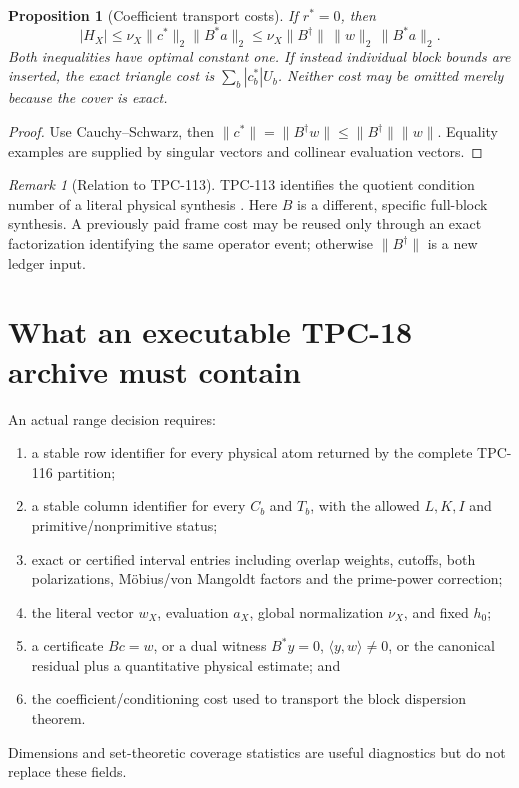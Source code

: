 \documentclass[11pt]{article}
\newtheorem{proposition}[theorem]{Proposition}
\theoremstyle{definition}
\theoremstyle{remark}
\newtheorem{remark}[theorem]{Remark}
\begin{document}
\begin{proposition}[Coefficient transport costs]
\label{prop:transport}
If \(r^*=0\), then
\[
 |H_X|
 \le\nu_X\|c^*\|_2\|B^*a\|_2
 \le\nu_X\|B^\dagger\|\,\|w\|_2\,\|B^*a\|_2.
\]
Both inequalities have optimal constant one.  If instead individual
block bounds are inserted, the exact triangle cost is
\(\sum_b|c_b^*|U_b\).  Neither cost may be omitted merely because
the cover is exact.
\end{proposition}

\begin{proof}
Use Cauchy--Schwarz, then
\(\|c^*\|=\|B^\dagger w\|\le\|B^\dagger\|\|w\|\).
Equality examples are supplied by singular vectors and collinear
evaluation vectors.
\end{proof}

\begin{remark}[Relation to TPC-113]
TPC-113 identifies the quotient condition number of a literal
physical synthesis \citep{WangTPC113}.  Here \(B\) is a different,
specific full-block synthesis.  A previously paid frame cost may be
reused only through an exact factorization identifying the same
operator event; otherwise \(\|B^\dagger\|\) is a new ledger input.
\end{remark}

\section{What an executable TPC-18 archive must contain}

An actual range decision requires:
\begin{enumerate}[leftmargin=2em]
\item a stable row identifier for every physical atom returned by
  the complete TPC-116 partition;
\item a stable column identifier for every \(C_b\) and \(T_b\), with
  the allowed \(L,K,I\) and primitive/nonprimitive status;
\item exact or certified interval entries including overlap weights,
  cutoffs, both polarizations, M\"obius/von Mangoldt factors and the
  prime-power correction;
\item the literal vector \(w_X\), evaluation \(a_X\), global
  normalization \(\nu_X\), and fixed \(h_0\);
\item a certificate \(Bc=w\), or a dual witness
  \(B^*y=0\), \(\langle y,w\rangle\ne0\), or the canonical residual
  plus a quantitative physical estimate; and
\item the coefficient/conditioning cost used to transport the block
  dispersion theorem.
\end{enumerate}
Dimensions and set-theoretic coverage statistics are useful
diagnostics but do not replace these fields.
\end{document}
